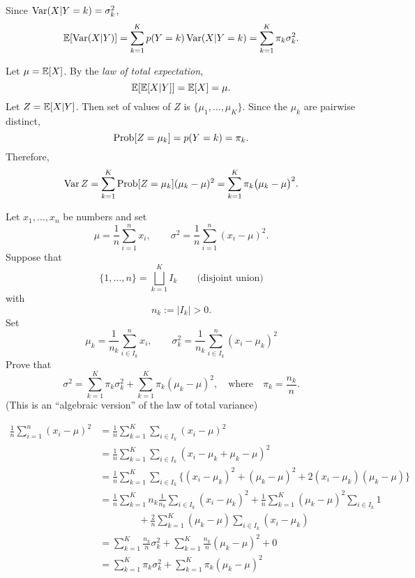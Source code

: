 \documentclass[12pt]{amsart}
\begin{document}
    Since $\operatorname{Var}(X|Y=k) = \sigma_k^2$,
    \[
        \operatorname{\mathbb{E}}[\operatorname{Var}(X|Y)] = \sum_{k=1}^K p(Y=k)\operatorname{Var}(X|Y=k) = \sum_{k=1}^K \pi_k\sigma_k^2.
    \]
    
    Let $\mu=\operatorname{\mathbb{E}}[X]$.
    By the \emph{law of total expectation},
    \[
        \operatorname{\mathbb{E}}[\operatorname{\mathbb{E}}[X|Y]] = \operatorname{\mathbb{E}}[X] = \mu.
    \]
    Let $Z=\operatorname{\mathbb{E}}[X|Y]$. Then set of values of $Z$ is $\{\mu_1,\ldots,\mu_K\}$.
    Since the $\mu_k$ are pairwise distinct,
    \[
        \operatorname{Prob}[Z = \mu_k] = p(Y=k) = \pi_k.
    \]
    Therefore,
    \[
        \operatorname{Var} Z = \sum_{k=1}^K \operatorname{Prob}[Z = \mu_k](\mu_k - \mu)^2
        = \sum_{k=1}^K \pi_k\big(\mu_k - \mu\big)^2.
    \]

    Let $x_1,\ldots,x_n$ be numbers and set 
    \[
        \mu = \frac1{n}\sum_{i=1}^n x_i,\qquad 
        \sigma^2 = \frac1{n}\sum_{i=1}^n (x_i - \mu)^2.
    \]
    Suppose that
    \[
        \{1,\ldots,n\} = \bigsqcup_{k=1}^K I_k\qquad \text{(disjoint union)}
    \]
    with
    \[
        n_k := |I_k| > 0.
    \]
    Set
    \[
        \mu_k = \frac1{n_k}\sum_{i\in I_k}^n x_i,\qquad 
        \sigma_k^2 = \frac1{n_k}\sum_{i\in I_k}^n (x_i - \mu_k)^2
    \]
    Prove that
    \[
        \sigma^2 = \sum_{k=1}^K \pi_k\sigma_k^2 + \sum_{k=1}^K \pi_k (\mu_k - \mu)^2,
        \quad\text{where}\quad
        \pi_k = \frac{n_k}n.
    \]
    (This is an ``algebraic version'' of the law of total variance)

    \begin{align*}
        \frac1{n}\sum_{i=1}^n (x_i - \mu)^2 &= \frac1{n}\sum_{k=1}^K \sum_{i\in I_k}(x_i - \mu)^2\\
        &= \frac1{n}\sum_{k=1}^K \sum_{i\in I_k}(x_i - \mu_k + \mu_k - \mu)^2\\
        &= \frac1{n}\sum_{k=1}^K \sum_{i\in I_k}
        \big\{(x_i - \mu_k)^2 + (\mu_k - \mu)^2 + 2(x_i - \mu_k)(\mu_k - \mu)\big\}\\
        &= \frac1{n}\sum_{k=1}^K n_k\frac1{n_k}\sum_{i\in I_k}(x_i - \mu_k)^2
        + \frac1{n}\sum_{k=1}^K(\mu_k - \mu)^2\sum_{i\in I_k}1\\
        &\qquad\qquad + \frac2{n}\sum_{k=1}^K (\mu_k - \mu)\sum_{i\in I_k}(x_i - \mu_k)\\
        &= \sum_{k=1}^K \frac{n_k}n \sigma_k^2 + \sum_{k=1}^K \frac{n_k}n (\mu_k - \mu)^2 + 0\\
        &= \sum_{k=1}^K \pi_k \sigma_k^2 + \sum_{k=1}^K \pi_k (\mu_k - \mu)^2
    \end{align*}
\end{document}
